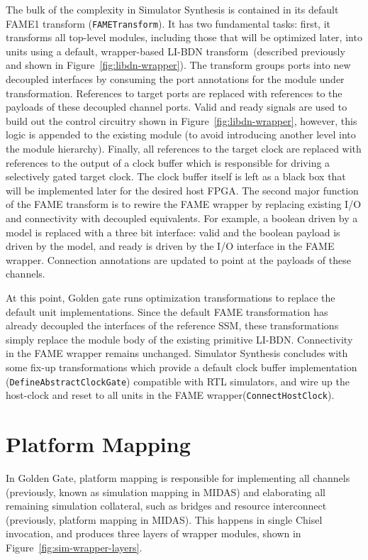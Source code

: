 The bulk of the complexity in Simulator Synthesis is contained in its default
FAME1 transform (\texttt{FAMETransform}). It has two fundamental tasks: first, it
transforms all top-level modules, including those that will be optimized later,
into units using a default, wrapper-based LI-BDN transform~(described
previously and shown in Figure~\ref{fig:libdn-wrapper}). The transform groups
ports into new decoupled interfaces by consuming the port annotations for the module under transformation.
References to target ports are replaced with references to the payloads
of these decoupled channel ports. Valid and ready signals are used to build out the
control circuitry shown in Figure~\ref{fig:libdn-wrapper}, however,
this logic is appended to the existing module (to avoid introducing another
level into the module hierarchy). Finally, all references to the target clock
are replaced with references to the output of a clock buffer which is responsible for driving a selectively
gated target clock.  The clock
buffer itself is left as a black box that will be implemented later for the
desired host FPGA.  The second major function of the FAME transform is to
rewire the FAME wrapper by replacing existing I/O and connectivity with decoupled
equivalents. For example, a boolean driven by a model is replaced with a three
bit interface: valid and the boolean payload is driven by the model, and ready
is driven by the I/O interface in the FAME wrapper. Connection annotations are
updated to point at the payloads of these channels.

At this point, Golden gate runs optimization transformations to replace the
default unit implementations. Since the default FAME
transformation has already decoupled the interfaces of the reference SSM, these
transformations simply replace the module body of the existing primitive LI-BDN.
Connectivity in the FAME wrapper remains unchanged.  Simulator Synthesis
concludes with some fix-up transformations which provide a default clock buffer
implementation (\texttt{DefineAbstractClockGate}) compatible with RTL
simulators, and wire up the host-clock and reset to all units in the FAME
wrapper(\texttt{ConnectHostClock}).

\section{Platform Mapping}\label{sec:gg-platform-mapping}

In Golden Gate, platform mapping is responsible for implementing all
channels (previously, known as simulation mapping in MIDAS) and elaborating
all remaining simulation collateral, such as bridges and resource interconnect
(previously, platform mapping in MIDAS). This happens in single Chisel
invocation, and produces three layers of wrapper modules, shown in Figure~\ref{fig:sim-wrapper-layers}.

